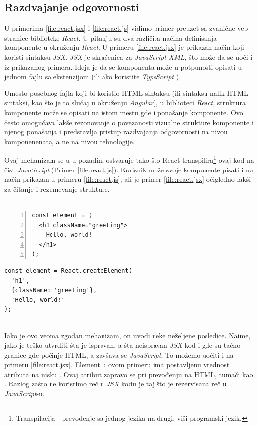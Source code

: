 \documentclass[12pt,oneside]{memoir}
\newcommand{\code}[1]{\colorbox{codegray}{\texttt{\scalebox{0.9}{#1}}}}%
\begin{document}
\subsection{Razdvajanje odgovornosti} \label{subsec:razdvajanje-odgovornosti}
U primerima \ref{file:react.jsx} i \ref{file:react.js} vidimo primer preuzet sa zvanične veb stranice biblioteke \emph{React}.
U pitanju su dva različita načina definisanja komponente u okruženju \emph{React}. U primeru \ref{file:react.jsx}
je prikazan način koji koristi sintaksu \emph{JSX}. \emph{JSX} je skraćenica za \emph{JavaScript-XML}, što može da se uoči i iz prikazanog primera.
Ideja je da se komponenta može u potpunosti opisati u jednom fajlu sa ekstenzijom \code{.jsx} (ili \code{.tsx} ako koristite \emph{TypeScript} \cite{TypeScript}).

Umesto posebnog fajla koji bi koristio HTML-sintaksu (ili sintaksu nalik HTML-sintaksi, kao što je to slučaj u okruženju \emph{Angular}),
u biblioteci \emph{React}, struktura komponente može se opisati na istom mestu gde i ponašanje komponente.
Ovo često omogućava lakše rezonovanje o povezanosti vizualne strukture komponente i njenog ponašanja i predstavlja
pristup razdvajanja odgovornosti na nivou komponenenata, a ne na nivou tehnologije. 

Ovaj mehanizam se u u pozadini ostvaruje tako što React transpilira\footnote{Transpilacija - prevođenje sa jednog jezika na drugi, viši programski jezik.}
ovaj kod na čist \emph{JavaScript} (Primer \ref{file:react.js}).
Korisnik može svoje komponente pisati i na način prikazan u primeru \ref{file:react.js}, ali je
primer \ref{file:react.jsx} očigledno lakši za čitanje i rezumevanje strukture.
\\
\\
\noindent\begin{minipage}[b]{.46\textwidth}
\begin{lstlisting}[style=htmlStyle, numbers=left, numberstyle=\tiny, caption={JSX-sintaksa},label=file:react.jsx]
const element = (
  <h1 className="greeting">
    Hello, world!
  </h1>
);
\end{lstlisting}
\end{minipage}
\hfill
\begin{minipage}[b]{.46\textwidth}
\begin{lstlisting}[style=jsStyle, caption={HTML-sintaksa},label=file:react.js]
const element = React.createElement(
  'h1',
  {className: 'greeting'},
  'Hello, world!'
);
\end{lstlisting}
\end{minipage}
\\
Iako je ovo veoma zgodan mehanizam, on uvodi neke neželjene posledice. Naime, jako je teško utvrditi šta je ispravan,
a šta neispravan \emph{JSX} kod i gde su tačno granice gde počinje HTML, a zavšava se \emph{JavaScript}. To možemo uočiti i na
primeru \ref{file:react.jsx}. Element \code{<h1>} u ovom primeru ima postavljenu vrednost atributa \code{className} na nisku \code{"greeting"}.
Ovaj atribut zapravo se pri prevođenju na HTML, tumači kao \code{class}. Razlog zašto ne koristimo reč \code{class}
u \emph{JSX} kodu je taj što je \code{class} rezervisana reč u \emph{JavaScript}-u.
\end{document}
